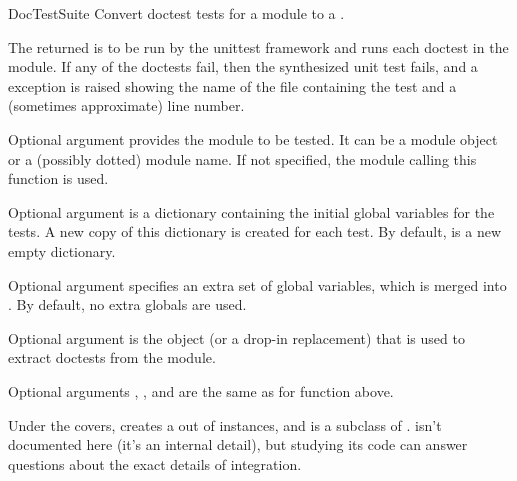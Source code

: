\begin{funcdesc}{DocTestSuite}{}
  Convert doctest tests for a module to a
  .

  The returned  is to be run by the
  unittest framework and runs each doctest in the module.  If any of the
  doctests fail, then the synthesized unit test fails, and a
   exception is raised showing the name of the
  file containing the test and a (sometimes approximate) line number.

  Optional argument  provides the module to be tested.  It
  can be a module object or a (possibly dotted) module name.  If not
  specified, the module calling this function is used.

  Optional argument  is a dictionary containing the
  initial global variables for the tests.  A new copy of this
  dictionary is created for each test.  By default,  is
  a new empty dictionary.

  Optional argument  specifies an extra set of
  global variables, which is merged into .  By default, no
  extra globals are used.

  Optional argument  is the 
  object (or a drop-in replacement) that is used to extract doctests
  from the module.

  Optional arguments , , and 
  are the same as for function  above.


\end{funcdesc}

Under the covers,  creates a
 out of 
instances, and  is a subclass of
.  isn't documented
here (it's an internal detail), but studying its code can answer questions
about the exact details of  integration.

